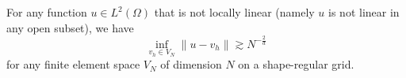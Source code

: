 %


\begin{conjecture}\label{conjecture1}
For any function $u\in L^2(\Omega)$ %
 that is not locally linear (namely $u$ is not
linear in any open subset), we  have 
\begin{equation}\label{lower_convergence_0_2}
\inf_{v_h\in V_N}\|u-v_h\| \gtrsim  N^{-\frac{2}{d}}
\end{equation}
for any finite element space $V_N$ of dimension $N$ on a shape-regular grid.
\end{conjecture}

